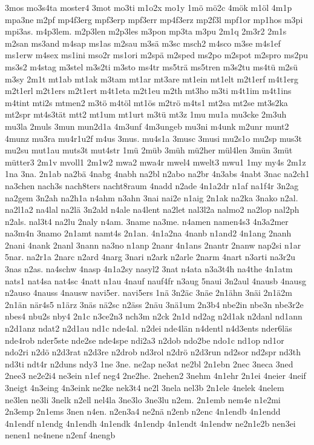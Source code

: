 {3mos
mo3s4ta
moster4
3mot
mo3ti
m1o2x
mo1y
1mö
mö2c
4mök
m1öl
4m1p
mpa3ne
m2pf
mp4f3erg
mpf3erp
mpf3err
mp4f3erz
mp2f3l
mpf1or
mp1hos
m3pi
mpi3as.
m4p3lem.
m2p3len
m2p3les
m3pon
mp3ta
m3pu
2m1q
2m3r2
2m1s
m2san
ms3and
m4sap
ms1as
m2sau
m3sä
m3sc
msch2
m4sco
m3se
m4s1ef
ms1erw
m4sex
ms1ini
mso2r
ms1ori
m2spä
m2sped
ms2po
m2spot
m2spro
ms2pu
ms3s2
m4stag
m3stel
m3s2ti
m3sto
ms4tr
ms5trä
ms5tren
m3s2tu
ms4tü
m2sü
m3sy
2m1t
mt1ab
mt1ak
m3tam
mt1ar
mt3are
mt1ein
mt1elt
m2t1erf
m4t1erg
m2t1erl
m2t1ers
m2t1ert
m4t1eta
m2t1eu
m2th
mt3ho
m3ti
m4t1im
m4t1ins
m4tint
mti2s
mtmen2
m3tö
m4töl
mt1ös
m2trö
m4ts1
mt2sa
mt2se
mt3s2ka
mt2spr
mt4s3tät
mtt2
mt1um
mt1urt
m3tü
mt3z
1mu
mu1a
mu3cke
2m3uh
mu3la
2muls
3mun
mun2d1a
4m3unf
4m3ungeb
mu3ni
m4unk
m2unr
munt2
4munz
mu3ra
mu4r1u2f
m4us
3mus.
mu4s1a
3musc
3musi
mu2s1o
mu2sp
mus3t
mu2su
mut1au
muts3t
mut4str
1mü
2müb
3müh
mü2her
mül4len
3mün
3müt
mütter3
2m1v
mvoll1
2m1w2
mwa2
mwa4r
mwel4
mwelt3
mwu1
1my
my4s
2m1z
1na
3na.
2n1ab
na2bä
4nabg
4nabh
na2bl
n2abo
na2br
4n3abs
4nabt
3nac
na2ch1
na3chen
nach3s
nach8ters
nacht8raum
4nadd
n2ade
4n1a2dr
n1af
na1f4r
3n2ag
na2gem
3n2ah
na2h1a
n4ahm
n3ahn
3nai
nai2e
n1aig
2n1ak
na2ka
3nako
n2al.
na2l1a2
na4lal
na2lä
3n2ald
n4ale
na4lent
na2let
nal3l2a
nalmo2
na2lop
nal2ph
n2als.
nal3t4
na2lu
2naly
n4am.
3name
na3me.
n4amen
namen4s3
4n3a2mer
na3m4n
3namo
2n1amt
namt4s
2n1an.
4n1a2na
4nanb
n1and2
4n1ang
2nanh
2nani
4nank
2nanl
3nann
na3no
n1anp
2nanr
4n1ans
2nantr
2nanw
nap2si
n1ar
5nar.
na2r1a
2narc
n2ard
4narg
3nari
n2ark
n2arle
2narm
4nart
n3arti
na3r2u
3nas
n2as.
na4schw
4nasp
4n1a2sy
nasyl2
3nat
n4ata
n3a3t4h
na4the
4n1atm
nats1
nat4sa
nat4sc
4natt
n1au
4nauf
nauf4fr
n3aug
5naui
3n2aul
4nausb
4nausg
n2auso
4nauss
4nausw
navi5er.
navi5ers
1nä
3n2äc
3näe
2n1ähn
3näi
2n1ä2m
2n1än
när4s5
n1ärz
3näs
nä2sc
n2äss
2näu
3nä1um
2n3b4
nbe2in
nbe3n
nbe3r2e
nbes4
nbu2s
nby4
2n1c
n3ce2n3
nch3m
n2ck
2n1d
nd2ag
n2d1ak
n2danl
nd1ann
n2d1anz
ndat2
n2d1au
nd1c
nde4al.
n2dei
nde4län
n4dentl
n4d3ents
nder6läs
nde4rob
nder5ste
nde2se
nde4spe
ndi2a3
n2dob
ndo2be
ndo1c
nd1op
nd1or
ndo2ri
n2dö
n2d3rat
n2d3re
n2drob
nd3rol
n2drö
n2d3run
nd2sor
nd2spr
nd3th
nd3ti
ndt4r
n2duns
ndy3
1ne
3ne.
ne2ap
ne3at
ne2bl
2n1ebn
2nec
3neca
3ned
2nee3
ne2e2i4
ne3ein
n1ef
neg4
2ne2he.
2nehen2
3nehm
4n1ehr
2n1ei
4neier
4neif
3neigt
4n3eing
4n3eink
ne2ke
nek3t4
ne2l
3nela
nel3b
2n1ele
4nelek
4nelem
ne3len
ne3li
3nelk
n2ell
nel4la
3ne3lo
3ne3lu
n2em.
2n1emb
nem4e
n1e2mi
2n3emp
2n1ems
3nen
n4en.
n2en3a4
ne2nä
n2enb
n2enc
4n1endb
4n1endd
4n1endf
n1endg
4n1endh
4n1endk
4n1endp
4n1endt
4n1endw
ne2n1e2b
nen3ei
nenen1
ne4nene
n2enf
4nengb
}
